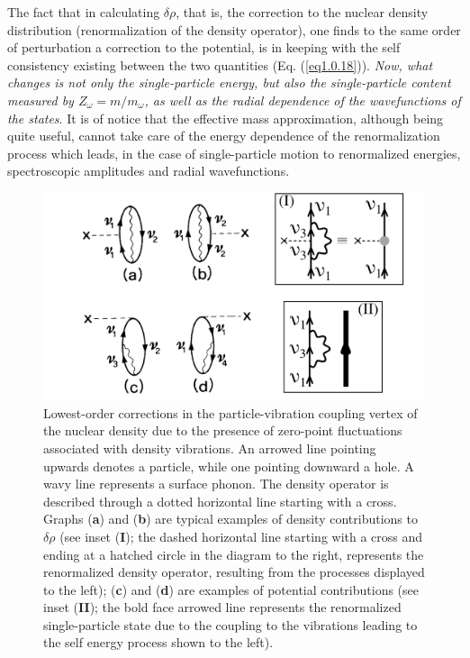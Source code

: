  The fact that in calculating $\delta\rho$, that is, the correction to the nuclear density distribution (renormalization of the density operator), one finds to the same order of perturbation a correction to the potential, is in keeping with the self consistency existing between the two quantities (Eq. (\ref{eq1.0.18})). \textit{Now, what changes is not only the single-particle energy, but also the single-particle content measured by $Z_\omega=m/m_\omega$, as well as the radial dependence of the wavefunctions of the states}. It is of notice that the effective mass approximation, although being quite useful, cannot take care of the energy dependence of the renormalization process which leads, in the case of single-particle motion to renormalized energies, spectroscopic amplitudes and radial wavefunctions. 
\begin{figure}
	\centerline {
		\includegraphics*[width=15cm, angle=0.]{introduccion/figs/fig0_8_1}
	}
	\caption{Lowest-order corrections in the particle-vibration coupling vertex of the nuclear density due to the presence of zero-point fluctuations associated with density vibrations. An arrowed line pointing upwards denotes a particle, while one pointing downward a hole. A wavy line represents a surface phonon. The density operator is described through a dotted horizontal line starting with a cross. Graphs (\textbf{a}) and (\textbf{b}) are typical examples of density contributions to $\delta\rho$ (see inset (\textbf{I}); the dashed horizontal line starting with a cross and ending at a hatched circle in the diagram to the right, represents the renormalized density operator, resulting from the processes displayed to the left); (\textbf{c}) and (\textbf{d}) are examples of potential contributions (see inset (\textbf{II}); the bold face arrowed line represents the renormalized single-particle state due to the coupling to the vibrations leading to the self energy process shown to the left).}
	\label{fig0.5.1}
\end{figure}
